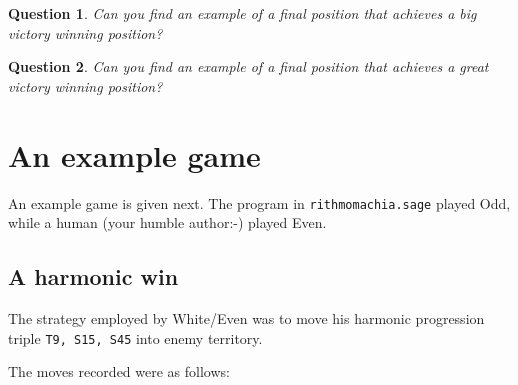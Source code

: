 \documentclass[14pt]{extarticle}
\newtheorem{question}{Question}
\begin{document}


\begin{question}
Can you find an example of a final position that achieves a big
victory winning position?
\end{question}
  

\begin{question}
Can you find an example of a final position that achieves a great
victory winning position?
\end{question}






\section{An example game}
\label{sec:example-game}

An example game is given next. The program in {\tt rithmomachia.sage} played
Odd, while a human (your humble author:-) played Even.

\subsection{A harmonic win}

The strategy employed by White/Even was to move his harmonic
progression triple 
{\tt T9, S15, S45} into enemy territory.

The moves recorded were as follows:
\end{document}
